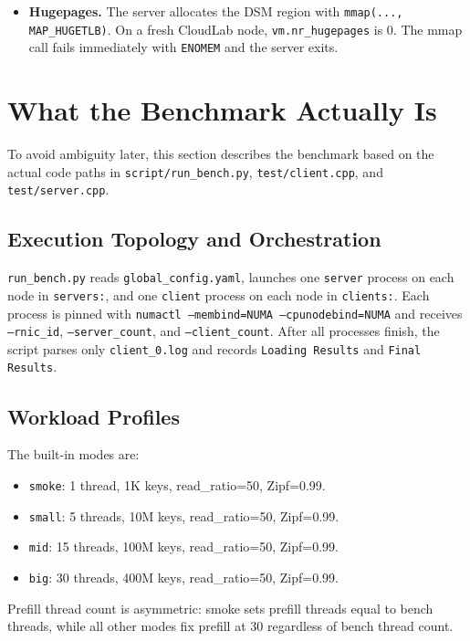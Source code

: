 \documentclass[10pt]{article}
\begin{document}
\begin{itemize}[nosep]
  \item \textbf{Hugepages.}
    The server allocates the DSM region with \texttt{mmap(..., MAP\_HUGETLB)}.
    On a fresh CloudLab node, \texttt{vm.nr\_hugepages} is 0.
    The mmap call fails immediately with \texttt{ENOMEM} and the server exits.
\end{itemize}

\section{What the Benchmark Actually Is}

To avoid ambiguity later, this section describes the benchmark based on the actual
code paths in \texttt{script/run\_bench.py}, \texttt{test/client.cpp},
and \texttt{test/server.cpp}.

\subsection{Execution Topology and Orchestration}

\texttt{run\_bench.py} reads \texttt{global\_config.yaml}, launches one
\texttt{server} process on each node in \texttt{servers:}, and one \texttt{client}
process on each node in \texttt{clients:}.
Each process is pinned with \texttt{numactl --membind=NUMA --cpunodebind=NUMA}
and receives \texttt{--rnic\_id}, \texttt{--server\_count}, and \texttt{--client\_count}.
After all processes finish, the script parses only \texttt{client\_0.log} and
records \texttt{Loading Results} and \texttt{Final Results}.

\subsection{Workload Profiles}

The built-in modes are:
\begin{itemize}[nosep]
  \item \texttt{smoke}: 1 thread, 1K keys, read\_ratio=50, Zipf=0.99.
  \item \texttt{small}: 5 threads, 10M keys, read\_ratio=50, Zipf=0.99.
  \item \texttt{mid}: 15 threads, 100M keys, read\_ratio=50, Zipf=0.99.
  \item \texttt{big}: 30 threads, 400M keys, read\_ratio=50, Zipf=0.99.
\end{itemize}
Prefill thread count is asymmetric: smoke sets prefill threads equal to bench threads,
while all other modes fix prefill at 30 regardless of bench thread count.
\end{document}
